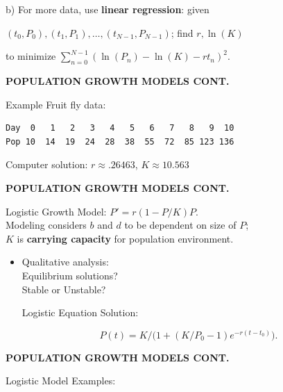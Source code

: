 \documentclass[12pt]{article}\usepackage[]{graphicx}\usepackage[]{color}
\newcommand{\zsp}{\rule{0pt}{5pt}}
\newcommand{\ind}{\zsp\hspace{6mm}}
\begin{document}
b) For more data, use {\bf linear regression}: given\\\ind
$(t_0,P_0), (t_1,P_1),\ldots,(t_{N-1},P_{N-1})$; find $r, \ln(K)$ 
\\\ind to minimize 
$\sum_{n=0}^{N-1}(\ln(P_n)-\ln(K)-rt_n)^2$.\\\vspace{1in}

\newpage\begin{center}{\bf POPULATION GROWTH MODELS CONT.}\end{center}

Example Fruit fly data:\vspace{-3mm}
\begin{verbatim}
Day  0   1   2   3   4   5   6   7   8   9  10 
Pop 10  14  19  24  28  38  55  72  85 123 136
\end{verbatim}
Computer solution: $r\approx .26463$, $K \approx 10.563$ 


\newpage\begin{center}{\bf POPULATION GROWTH MODELS CONT.}\end{center}

Logistic Growth Model: $P' = r(1-P/K)P$. \\
Modeling considers $b$ and $d$ to be dependent on size of $P$;\\
$K$ is {\bf carrying capacity} for population environment.   
\begin{itemize}
\item Qualitative analysis: \\
Equilibrium solutions?\\
Stable or Unstable?\vspace{.5in}

Logistic Equation Solution:\vspace{5.5in}

$$P(t) = K/\big(1+(K/P_0-1)e^{-r(t-t_0)}\big).$$
\end{itemize}
\newpage\begin{center}{\bf POPULATION GROWTH MODELS CONT.}\end{center}

Logistic Model Examples: 
\end{document}
